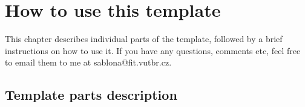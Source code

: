 





\chapter{How to use this template}
\label{jak}

This chapter describes individual parts of the template, followed by a brief instructions on how to use it. If you have any questions, comments etc, feel free to email them to me at sablona@fit.vutbr.cz.

\section*{Template parts description}

